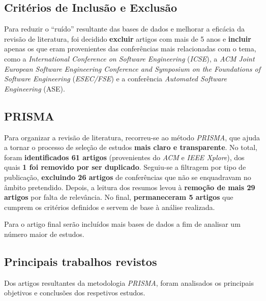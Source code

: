 	\subsection{Critérios de Inclusão e Exclusão}
		Para reduzir o “ruído” resultante das bases de dados e melhorar a eficácia da revisão de literatura, foi decidido \textbf{excluir} artigos com mais de 5 anos e \textbf{incluir} apenas os que eram provenientes das conferências mais relacionadas com o tema, como a \textit{International Conference on Software Engineering} (\textit{ICSE}), a \textit{ACM Joint European Software Engineering Conference and Symposium on the Foundations of Software Engineering} (\textit{ESEC/FSE}) e a conferência \textit{Automated Software Engineering} (ASE\textit{}). 
		
	\subsection{PRISMA}
		Para organizar a revisão de literatura, recorreu-se ao método \textit{PRISMA}, que ajuda a tornar o processo de seleção de estudos \textbf{mais claro e transparente}. No total, foram \textbf{identificados 61 artigos} (provenientes do \textit{ACM} e \textit{IEEE Xplore}), dos quais \textbf{1 foi removido por ser duplicado}. Seguiu-se a filtragem por tipo de publicação, \textbf{excluindo 26 artigos} de conferências que não se enquadravam no âmbito pretendido. Depois, a leitura dos resumos levou à \textbf{remoção de mais 29 artigos }por falta de relevância. No final, \textbf{permaneceram 5 artigos} que cumprem os critérios definidos e servem de base à análise realizada.
		
		Para o artigo final serão incluídos mais bases de dados a fim de analisar um número maior de estudos.
		
	\subsection{Principais trabalhos revistos}
		Dos artigos resultantes da metodologia \textit{PRISMA}, foram analisados os principais objetivos e conclusões dos respetivos estudos.
		
